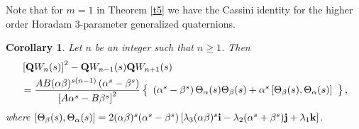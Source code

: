 \documentclass{kms-c}
\theoremstyle{plain}
\newtheorem{corollary}[theorem]{Corollary}
\theoremstyle{definition}
\theoremstyle{remark}
\begin{document}
Note that for $m=1$ in Theorem \ref{t5} we have the Cassini identity for the higher order Horadam 3-parameter generalized quaternions.
\begin{corollary}
Let $n$ be an integer such that $n\geq 1$. Then
\begin{align*}
&\left[\textnormal{\textbf{Q}}W_{n}(s)\right]^{2}-\textnormal{\textbf{Q}}W_{n-1}(s)\textnormal{\textbf{Q}}W_{n+1}(s)\\
&=\frac{AB(\alpha\beta)^{s(n-1)}\left(\alpha^{s}-\beta^{s}\right)}{\left[A\alpha^{s}-B\beta^{s}\right]^{2}}\left\lbrace \begin{array}{c} 
\left(\alpha^{s}-\beta^{s}\right)\Theta_{\alpha}(s)\Theta_{\beta}(s)+ \alpha^{s}\left[\Theta_{\beta}(s),\Theta_{\alpha}(s)\right]
\end{array}\right\rbrace ,
\end{align*}
where $\left[\Theta_{\beta}(s),\Theta_{\alpha}(s)\right]=2(\alpha\beta)^{s}(\alpha^{s}-\beta^{s})\left[\lambda_{3}(\alpha\beta)^{s}\textnormal{\textbf{i}}-\lambda_{2}(\alpha^{s}+\beta^{s})\textnormal{\textbf{j}}+\lambda_{1}\textnormal{\textbf{k}}\right]$.
\end{corollary}
\end{document}
